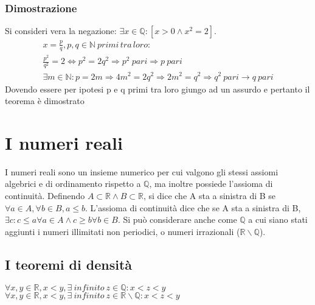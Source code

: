 \subsubsection*{Dimostrazione}
Si consideri vera la negazione: $\exists x\in\mathbb{Q}:[x>0\wedge x^2=2]$.
\begin{gather*}
x=\frac{p}{q},p,q\in \mathbb{N}\:primi\,tra\,loro:\\
\frac{p^2}{q^2}=2\Leftrightarrow p^2=2q^2\Rightarrow p^2\:pari \Rightarrow p \: pari\\
\exists m\in\mathbb{N}:p=2m \Rightarrow 4m^2=2q^2\Rightarrow 2m^2=q^2\Rightarrow q^2\:pari\rightarrow q\:pari
\end{gather*}
Dovendo essere per ipotesi p e q primi tra loro giungo ad un assurdo e pertanto il teorema \`e dimostrato
\section{I numeri reali}
I numeri reali sono un insieme numerico per cui valgono gli stessi assiomi algebrici e di ordinamento rispetto a $\mathbb{Q}$, ma inoltre possiede l'assioma di continuit\`a.
Definendo $A \subset \mathbb{R} \wedge B \subset \mathbb{R}$, si dice che A sta a sinistra di B se $\forall a \in A, \forall b \in B, a\le b$. L'assioma di continuit\`a dice
che se A sta a sinistra di B, $\exists c: c\le a \forall a \in A \wedge c\ge b \forall b \in B$. Si pu\`o considerare anche come $\mathbb{Q}$ a cui siano stati aggiunti i 
numeri illimitati non periodici, o numeri irrazionali ($\mathbb{R}\backslash\mathbb{Q}$).\\
\subsection{I teoremi di densit\`a}
$\forall x, y \in \mathbb{R}, x<y, \exists\: infinito\: z\in \mathbb{Q}: x<z<y$\\
$\forall x, y \in \mathbb{R}, x<y, \exists \:infinito\: z\in \mathbb{R}\backslash\mathbb{Q}: x<z<y$